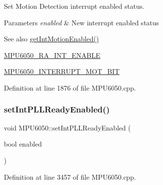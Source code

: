Set Motion Detection interrupt enabled status. 
\begin{DoxyParams}{Parameters}
{\em enabled} & New interrupt enabled status \\
\hline
\end{DoxyParams}
\begin{DoxySeeAlso}{See also}
\mbox{\hyperlink{classMPU6050_a7de31a8e9f22765329d9f9e02db2f1f0}{get\+Int\+Motion\+Enabled()}} 

\mbox{\hyperlink{MPU6050_8h_a1de9d9557aa7420c746721999df4a377}{M\+P\+U6050\+\_\+\+R\+A\+\_\+\+I\+N\+T\+\_\+\+E\+N\+A\+B\+LE}} 

\mbox{\hyperlink{MPU6050_8h_a510f9a47269818529f7dc7f7d5e662ae}{M\+P\+U6050\+\_\+\+I\+N\+T\+E\+R\+R\+U\+P\+T\+\_\+\+M\+O\+T\+\_\+\+B\+IT}} 
\end{DoxySeeAlso}


Definition at line 1876 of file M\+P\+U6050.\+cpp.


\begin{DoxyCode}{0}

\end{DoxyCode}
\mbox{\label{classMPU6050_aef44106927c1b986588f36bffaebea54}} 
\subsubsection{\texorpdfstring{setIntPLLReadyEnabled()}{setIntPLLReadyEnabled()}}
{\footnotesize\ttfamily void M\+P\+U6050\+::set\+Int\+P\+L\+L\+Ready\+Enabled (\begin{DoxyParamCaption}\item[{bool}]{enabled }\end{DoxyParamCaption})}



Definition at line 3457 of file M\+P\+U6050.\+cpp.


